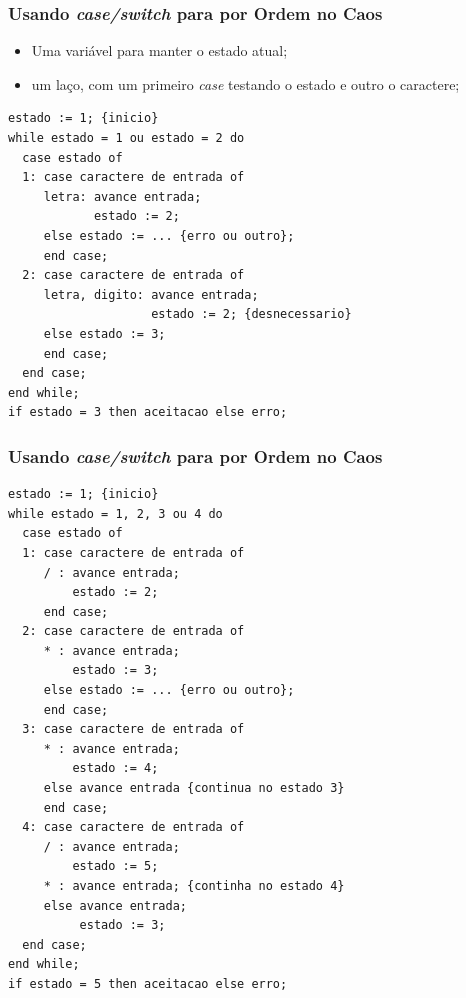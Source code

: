 \documentclass[table]{beamer}
\begin{document}
\begin{frame}[fragile]
   \frametitle{Usando \textit{case/switch} para por Ordem no Caos}
   \begin{itemize}
      \item Uma variável para manter o estado atual;
      \item um laço, com um primeiro \textit{case} testando o estado e outro o caractere;
   \end{itemize}
   \footnotesize
   \begin{verbatim}
estado := 1; {inicio}
while estado = 1 ou estado = 2 do
  case estado of
  1: case caractere de entrada of
     letra: avance entrada;
            estado := 2;
     else estado := ... {erro ou outro};
     end case;
  2: case caractere de entrada of
     letra, digito: avance entrada;
                    estado := 2; {desnecessario}
     else estado := 3;
     end case;
  end case;
end while;
if estado = 3 then aceitacao else erro;
   \end{verbatim}
\end{frame}

\begin{frame}[fragile]
   \frametitle{Usando \textit{case/switch} para por Ordem no Caos}
   \tiny
   \begin{verbatim}
estado := 1; {inicio}
while estado = 1, 2, 3 ou 4 do
  case estado of
  1: case caractere de entrada of
     / : avance entrada;
         estado := 2;
     end case;
  2: case caractere de entrada of
     * : avance entrada;
         estado := 3;
     else estado := ... {erro ou outro};
     end case;
  3: case caractere de entrada of
     * : avance entrada;
         estado := 4;
     else avance entrada {continua no estado 3}
     end case;
  4: case caractere de entrada of
     / : avance entrada;
         estado := 5;
     * : avance entrada; {continha no estado 4}
     else avance entrada;
          estado := 3;
  end case;
end while;
if estado = 5 then aceitacao else erro;
   \end{verbatim}
\end{frame}
\end{document}
